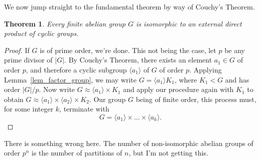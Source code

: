 \documentclass[12pt]{article}
\newtheorem{theorem}{Theorem}[section]
\begin{document}
We now jump straight to the fundamental theorem by way of Couchy's Theorem.

\begin{theorem}
Every finite abelian group $G$ is isomorphic to an external direct product
of cyclic groups.
\end{theorem}
\begin{proof}
If $G$ is of prime order, we're done.  This not being the case, let $p$
be any prime divisor of $|G|$.  By Couchy's Theorem, there exists an element $a_1\in G$
of order $p$, and therefore a cyclic subgroup $\langle a_1\rangle$ of $G$ of order $p$.
Applying Lemma~\ref{lem_factor_group}, we may write
$G=\langle a_1\rangle K_1$, where $K_1<G$ and has order $|G|/p$.
Now write $G\approx\langle a_1\rangle\times K_1$ and apply our procedure
again with $K_1$ to obtain $G\approx\langle a_1\rangle\times\langle a_2\rangle\times K_2$.
Our group $G$ being of finite order, this process must, for some integer $k$, terminate with
\begin{equation*}
G=\langle a_1\rangle\times\dots\times\langle a_k\rangle.
\end{equation*}
\end{proof}

There is something wrong here.  The number of non-isomorphic abelian groups of order $p^n$
is the number of partitions of $n$, but I'm not getting this.
\end{document}
